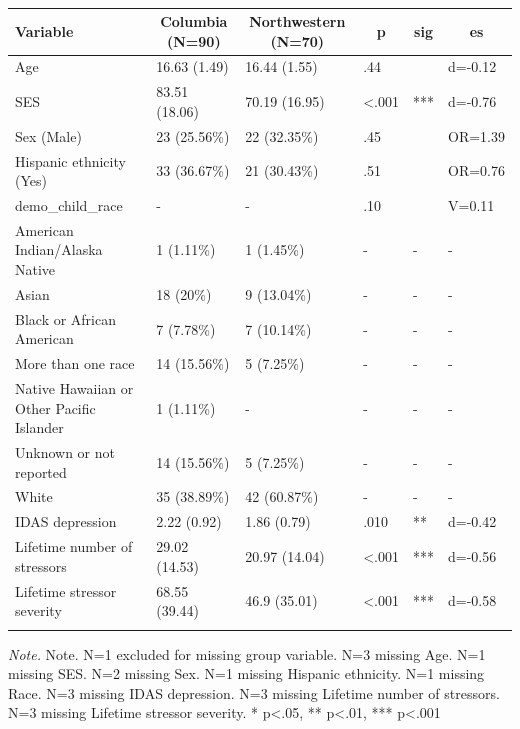 \documentclass[
  man]{apa7}
\begin{document}
\begin{table}[tbp]

\begin{center}
\begin{threeparttable}

\caption{\label{tab:demoTable}}

\begin{tabular}{llllll}
\toprule
Variable & \multicolumn{1}{c}{Columbia (N=90)} & \multicolumn{1}{c}{Northwestern (N=70)} & \multicolumn{1}{c}{p} & \multicolumn{1}{c}{sig} & \multicolumn{1}{c}{es}\\
\midrule
Age & 16.63 (1.49) & 16.44 (1.55) & .44 &  & d=-0.12\\
SES & 83.51 (18.06) & 70.19 (16.95) & <.001 & *** & d=-0.76\\
Sex (Male) & 23 (25.56\%) & 22 (32.35\%) & .45 &  & OR=1.39\\
Hispanic ethnicity (Yes) & 33 (36.67\%) & 21 (30.43\%) & .51 &  & OR=0.76\\
demo\_child\_race & - & - & .10 &  & V=0.11\\
American Indian/Alaska Native & 1 (1.11\%) & 1 (1.45\%) & - & - & -\\
Asian & 18 (20\%) & 9 (13.04\%) & - & - & -\\
Black or African American & 7 (7.78\%) & 7 (10.14\%) & - & - & -\\
More than one race & 14 (15.56\%) & 5 (7.25\%) & - & - & -\\
Native Hawaiian or Other Pacific Islander & 1 (1.11\%) & - & - & - & -\\
Unknown or not reported & 14 (15.56\%) & 5 (7.25\%) & - & - & -\\
White & 35 (38.89\%) & 42 (60.87\%) & - & - & -\\
IDAS depression & 2.22 (0.92) & 1.86 (0.79) & .010 & ** & d=-0.42\\
Lifetime number of stressors & 29.02 (14.53) & 20.97 (14.04) & <.001 & *** & d=-0.56\\
Lifetime stressor severity & 68.55 (39.44) & 46.9 (35.01) & <.001 & *** & d=-0.58\\
\bottomrule
\addlinespace
\end{tabular}

\begin{tablenotes}[para]
\normalsize{\textit{Note.} Note. N=1 excluded for missing group variable. N=3 missing Age. N=1 missing SES. N=2 missing Sex. N=1 missing Hispanic ethnicity. N=1 missing Race. N=3 missing IDAS depression. N=3 missing Lifetime number of stressors. N=3 missing Lifetime stressor severity. * p<.05, ** p<.01, *** p<.001}
\end{tablenotes}

\end{threeparttable}
\end{center}

\end{table}
\end{document}
